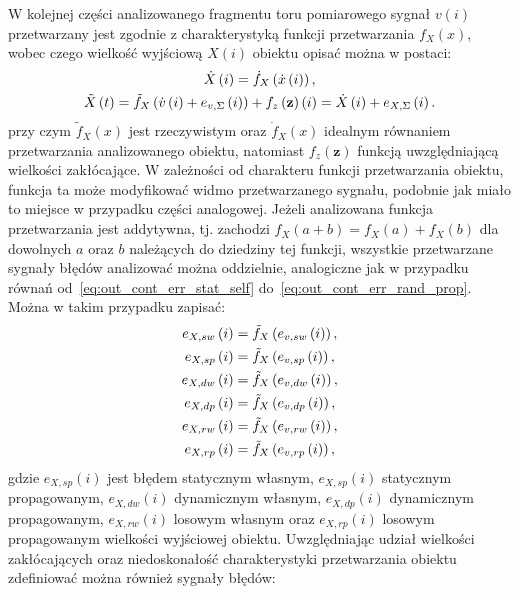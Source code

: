 W kolejnej części analizowanego fragmentu toru pomiarowego sygnał $v(i)$ przetwarzany jest zgodnie z charakterystyką funkcji przetwarzania $f_{X}(x)$, wobec czego wielkość wyjściową $X(i)$ obiektu opisać można w postaci:
\begin{gather}
\dot{X} \left(i\right) = \dot{f}_{X} \left( \dot{x} \left(i\right) \right) \label{eq:out_disc_ideal_all}, \\
\tilde{X} \left(t\right) = \tilde{f}_{X} \left( \dot{v} \left(i\right) + e_{v,\Sigma} \left(i\right) \right) + f_{z} \left(\mathbf{z}\right)\left(i\right) = \dot{X} \left(i\right) + e_{X,\Sigma} \left(i\right) \label{eq:out_disc_real_all}.
\end{gather}
przy czym $\tilde{f}_{X}(x)$ jest rzeczywistym oraz $\dot{f}_{X}(x)$ idealnym równaniem przetwarzania analizowanego obiektu, natomiast $f_{z}(\mathbf{z})$ funkcją uwzględniającą wielkości zakłócające. W zależności od charakteru funkcji przetwarzania obiektu, funkcja ta może modyfikować widmo przetwarzanego sygnału, podobnie jak miało to miejsce w przypadku części analogowej. Jeżeli analizowana funkcja przetwarzania jest addytywna, tj. zachodzi $f_{X}(a + b) = f_{X}(a) + f_{X}(b)$ dla dowolnych $a$ oraz $b$ należących do dziedziny tej funkcji, wszystkie przetwarzane sygnały błędów analizować można oddzielnie, analogiczne jak w przypadku równań od~\eqref{eq:out_cont_err_stat_self} do~\eqref{eq:out_cont_err_rand_prop}. Można w takim przypadku zapisać:
\begin{gather}
e_{X,sw} \left(i\right) = \tilde{f}_{X} \left( e_{v,sw} \left(i\right) \right) \label{eq:out_disc_err_stat_self}, \\
e_{X,sp} \left(i\right) = \tilde{f}_{X} \left( e_{v,sp} \left(i\right) \right) \label{eq:out_disc_err_stat_prop}, \\
e_{X,dw} \left(i\right) = \tilde{f}_{X} \left( e_{v,dw} \left(i\right) \right) \label{eq:out_disc_err_dyn_prop}, \\
e_{X,dp} \left(i\right) = \tilde{f}_{X} \left( e_{v,dp} \left(i\right) \right) \label{eq:out_disc_err_dyn_self}, \\
e_{X,rw} \left(i\right) = \tilde{f}_{X} \left( e_{v,rw} \left(i\right) \right) \label{eq:out_disc_err_rand_self}, \\
e_{X,rp} \left(i\right) = \tilde{f}_{X} \left( e_{v,rp} \left(i\right) \right) \label{eq:out_disc_err_rand_prop},
\end{gather}
gdzie $e_{X,sp}(i)$ jest błędem statycznym własnym, $e_{X,sp}(i)$ statycznym propagowanym, $e_{X,dw}(i)$ dynamicznym własnym, $e_{X,dp}(i)$ dynamicznym propagowanym, $e_{X,rw}(i)$ losowym własnym oraz $e_{X,rp}(i)$ losowym propagowanym wielkości wyjściowej obiektu. Uwzględniając udział wielkości zakłócających oraz niedoskonałość charakterystyki przetwarzania obiektu zdefiniować można również sygnały błędów:
